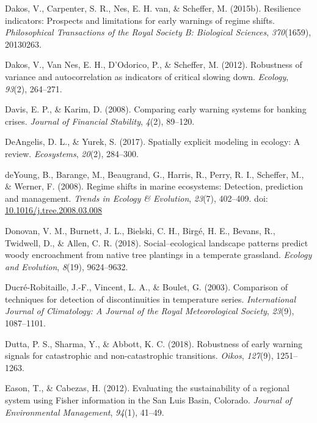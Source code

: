 \documentclass[12pt,twoside,openany]{reedthesis}
\begin{document}
\leavevmode\hypertarget{ref-dakos2015resilience}{}%
Dakos, V., Carpenter, S. R., Nes, E. H. van, \& Scheffer, M. (2015b). Resilience indicators: Prospects and limitations for early warnings of regime shifts. \emph{Philosophical Transactions of the Royal Society B: Biological Sciences}, \emph{370}(1659), 20130263.

\leavevmode\hypertarget{ref-dakos2012robustness}{}%
Dakos, V., Van Nes, E. H., D'Odorico, P., \& Scheffer, M. (2012). Robustness of variance and autocorrelation as indicators of critical slowing down. \emph{Ecology}, \emph{93}(2), 264--271.

\leavevmode\hypertarget{ref-davis_comparing_2008}{}%
Davis, E. P., \& Karim, D. (2008). Comparing early warning systems for banking crises. \emph{Journal of Financial Stability}, \emph{4}(2), 89--120.

\leavevmode\hypertarget{ref-deangelis2017spatially}{}%
DeAngelis, D. L., \& Yurek, S. (2017). Spatially explicit modeling in ecology: A review. \emph{Ecosystems}, \emph{20}(2), 284--300.

\leavevmode\hypertarget{ref-deyoung_regime_2008}{}%
deYoung, B., Barange, M., Beaugrand, G., Harris, R., Perry, R. I., Scheffer, M., \& Werner, F. (2008). Regime shifts in marine ecosystems: Detection, prediction and management. \emph{Trends in Ecology \& Evolution}, \emph{23}(7), 402--409. doi: \href{https://doi.org/10.1016/j.tree.2008.03.008}{10.1016/j.tree.2008.03.008}

\leavevmode\hypertarget{ref-donovan2018social}{}%
Donovan, V. M., Burnett, J. L., Bielski, C. H., Birgé, H. E., Bevans, R., Twidwell, D., \& Allen, C. R. (2018). Social--ecological landscape patterns predict woody encroachment from native tree plantings in a temperate grassland. \emph{Ecology and Evolution}, \emph{8}(19), 9624--9632.

\leavevmode\hypertarget{ref-ducre2003comparison}{}%
Ducré-Robitaille, J.-F., Vincent, L. A., \& Boulet, G. (2003). Comparison of techniques for detection of discontinuities in temperature series. \emph{International Journal of Climatology: A Journal of the Royal Meteorological Society}, \emph{23}(9), 1087--1101.

\leavevmode\hypertarget{ref-dutta2018robustness}{}%
Dutta, P. S., Sharma, Y., \& Abbott, K. C. (2018). Robustness of early warning signals for catastrophic and non-catastrophic transitions. \emph{Oikos}, \emph{127}(9), 1251--1263.

\leavevmode\hypertarget{ref-eason_evaluating_2012}{}%
Eason, T., \& Cabezas, H. (2012). Evaluating the sustainability of a regional system using Fisher information in the San Luis Basin, Colorado. \emph{Journal of Environmental Management}, \emph{94}(1), 41--49.
\end{document}
